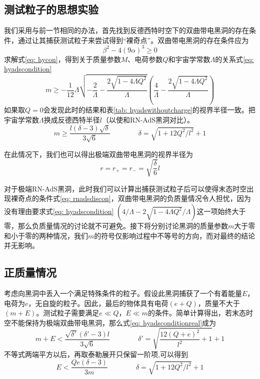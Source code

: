 \subsection{测试粒子的思想实验}
我们采用与前一节相同的办法，首先找到反德西特时空下的双曲带电黑洞的存在条件，通过让其捕获测试粒子来尝试得到“裸奇点”。双曲带电黑洞的存在条件应为
\begin{equation}\label{eq: hycon}
    \beta^2-4 \left(9\alpha\right)^3 \geq 0
\end{equation}
求解式\eqref{eq: hycon}，得到关于质量参数$M$、电荷参数$Q$和宇宙学常数$\Lambda$的关系式\eqref{eq: hyadscondition}
\begin{equation}\label{eq: hyadscondition}
    m \geq -\frac{1}{12} \Lambda  \sqrt{-\frac{2}{\Lambda }-\frac{2 \sqrt{1-4 \Lambda  Q^2}}{\Lambda }} \left(\frac{4}{\Lambda }-\frac{2 \sqrt{1-4 \Lambda 
    Q^2}}{\Lambda }\right)
\end{equation}
如果取$Q=0$会发现此时的结果和表\ref{tab: hyadswithoutcharge}的视界半径一致。把宇宙学常数$\Lambda$换成反德西特半径$l$（以使和RN-AdS黑洞对比）。
\begin{equation}\label{eq: hyadsconditionreal}
    m\geq \frac{l\left(\delta-3\right)\sqrt{\delta}}{3\sqrt{6}} \qquad \qquad \delta=\sqrt{1+12Q^2/l^2}+1
\end{equation}

在此情况下，我们也可以得出极端双曲带电黑洞的视界半径为
\begin{equation}\label{eq: hyadsextramhorizon}
    r=r_+=r_-=\sqrt{\frac{\delta}{6}}l
\end{equation}

对于极端RN-AdS黑洞，此时我们可以计算出捕获测试粒子后可以使得末态时空出现裸奇点的条件式\eqref{eq: rnadsdiscon}，双曲带电黑洞的负质量情况令人担忧，因为没有理由要求式\eqref{eq: hyadscondition} $\left(4/\Lambda -2 \sqrt{1-4 \Lambda Q^2}/\Lambda \right)$这一项始终大于零，那么负质量情况的讨论就不可避免。接下将分别讨论黑洞的质量参数$m$大于零和小于零的两种情况，我们$m$的符号仅影响过程中不等号的方向，而对最终的结论并无影响。
\subsection{正质量情况}
考虑向黑洞中丢入一个满足特殊条件的粒子。假设此黑洞捕获了一个有着能量$E$，电荷为$e$，无自旋的粒子。因此，最后的物体具有电荷$\left(e+Q\right)$，质量不大于$\left(m+E\right)$。测试粒子需要满足$e\ll Q$，$E\ll m$的条件。简单计算得出，若末态时空不能保持为极端双曲带电黑洞，那么式\eqref{eq: hyadsconditionreal}成为
\begin{equation}\label{eq: hyadsputtestparticle}
    m+E < \frac{\sqrt{\delta' } (\delta' -3) l}{3 \sqrt{6}} \quad\quad\quad\quad  \delta'= \sqrt{\frac{12 \left(Q+e\right)^2}{l^2}+1}+1
\end{equation}
不等式两端平方以后，再取泰勒展开只保留一阶项,可以得到
\begin{equation}\label{eq: hyadsdiscon}
    E < \frac{Q e \left(\delta-3\right)}{3 m} \qquad \qquad \delta=\sqrt{1+12Q^2/l^2}+1
\end{equation}

